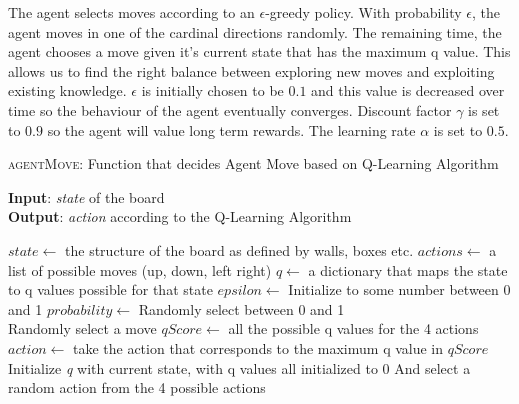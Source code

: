 \documentclass{article}
\begin{document}
The agent selects moves according to an $\epsilon$-greedy policy. With probability $\epsilon$, the agent moves in one of the cardinal directions randomly. The remaining time, the agent chooses a move given it's current state that has the maximum q value. This allows us to find the right balance between exploring new moves and exploiting existing knowledge.  $\epsilon$ is initially chosen to be $0.1$ and this value is decreased over time so the behaviour of the agent eventually converges. Discount factor $\gamma$ is set to $0.9$ so the agent will value long term rewards. The learning rate $\alpha$ is set to $0.5$.

\begin{algorithm}
    \caption{\textsc{agentMove}: Function that decides Agent Move based on Q-Learning Algorithm}\label{euclid}
    \hspace*{\algorithmicindent} \textbf{Input}: \emph{state} of the board \\
    \hspace*{\algorithmicindent} \textbf{Output}: \emph{action} according to the Q-Learning  Algorithm \\
    \begin{algorithmic}
    \State $state \gets$ the structure of the board as defined by walls, boxes etc.
    \State $actions \gets$ a list of possible moves (up, down, left right)
    \State $q \gets$ a dictionary that maps the state to q values possible for that state
    \State $epsilon \gets$ Initialize to some number between 0 and 1
    \State $probability \gets$ Randomly select between 0 and 1 \\
        \State Randomly select a move
    \Else
            \State $qScore \gets$ all the possible q values for the 4 actions
            \State $action \gets$ take the action that corresponds to the maximum q value in $qScore$
        \Else
            \State Initialize \emph{q} with current state, with q values all initialized to 0
            \State And select a random action from the 4 possible actions
        \EndIf
    \EndIf 
    \end{algorithmic}
\end{algorithm}
\end{document}
